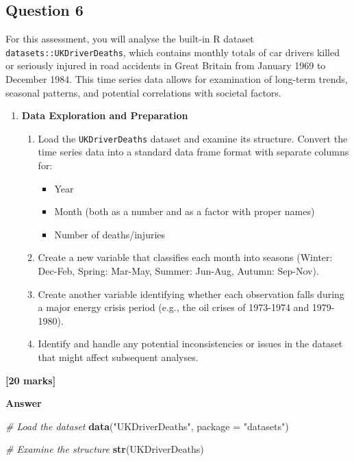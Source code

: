 \documentclass[
  10t,
]{article}
\newenvironment{Shaded}{\begin{snugshade}}{\end{snugshade}}
\newcommand{\AttributeTok}[1]{\textcolor[rgb]{0.13,0.29,0.53}{#1}}
\newcommand{\CommentTok}[1]{\textcolor[rgb]{0.56,0.35,0.01}{\textit{#1}}}
\newcommand{\FunctionTok}[1]{\textcolor[rgb]{0.13,0.29,0.53}{\textbf{#1}}}
\newcommand{\NormalTok}[1]{#1}
\newcommand{\StringTok}[1]{\textcolor[rgb]{0.31,0.60,0.02}{#1}}
\providecommand{\tightlist}{%
  \setlength{\itemsep}{0pt}\setlength{\parskip}{0pt}}
\let\oldtexttt\texttt
\renewcommand{\texttt}[1]{\oldtexttt{\small #1}}
\begin{document}
\subsection{Question 6}\label{question-6-1}

For this assessment, you will analyse the built-in R dataset
\texttt{datasets::UKDriverDeaths}, which contains monthly totals of car
drivers killed or seriously injured in road accidents in Great Britain
from January 1969 to December 1984. This time series data allows for
examination of long-term trends, seasonal patterns, and potential
correlations with societal factors.

\begin{enumerate}
\def\labelenumi{\alph{enumi}.}
\tightlist
\item
  \textbf{Data Exploration and Preparation}

  \begin{enumerate}
  \def\labelenumii{\roman{enumii}.}
  \tightlist
  \item
    Load the \texttt{UKDriverDeaths} dataset and examine its structure.
    Convert the time series data into a standard data frame format with
    separate columns for:

    \begin{itemize}
    \tightlist
    \item
      Year
    \item
      Month (both as a number and as a factor with proper names)
    \item
      Number of deaths/injuries
    \end{itemize}
  \item
    Create a new variable that classifies each month into seasons
    (Winter: Dec-Feb, Spring: Mar-May, Summer: Jun-Aug, Autumn:
    Sep-Nov).
  \item
    Create another variable identifying whether each observation falls
    during a major energy crisis period (e.g., the oil crises of
    1973-1974 and 1979-1980).
  \item
    Identify and handle any potential inconsistencies or issues in the
    dataset that might affect subsequent analyses.
  \end{enumerate}
\end{enumerate}

\textbf{{[}20 marks{]}}

\textbf{Answer}

\begin{Shaded}
\begin{Highlighting}[]
\CommentTok{\# Load the dataset}
\FunctionTok{data}\NormalTok{(}\StringTok{"UKDriverDeaths"}\NormalTok{, }\AttributeTok{package =} \StringTok{"datasets"}\NormalTok{)}

\CommentTok{\# Examine the structure}
\FunctionTok{str}\NormalTok{(UKDriverDeaths)}
\end{Highlighting}
\end{Shaded}
\end{document}
